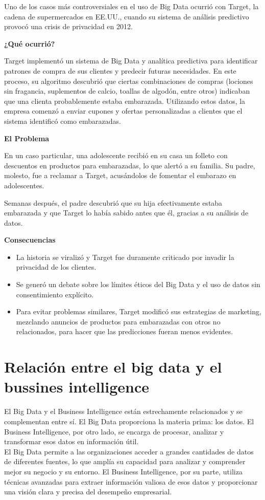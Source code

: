 \documentclass[12pt]{article}
\begin{document}
Uno de los casos más controversiales en el uso de Big Data ocurrió con Target, la cadena de supermercados en EE.UU., 
cuando su sistema de análisis predictivo provocó una crisis de privacidad en 2012.

\textbf{¿Qué ocurrió?}

Target implementó un sistema de Big Data y analítica predictiva para identificar patrones de compra de sus clientes y 
predecir futuras necesidades. En este proceso, su algoritmo descubrió que ciertas combinaciones de compras 
(lociones sin fragancia, suplementos de calcio, toallas de algodón, entre otros) indicaban que una clienta probablemente 
estaba embarazada.
Utilizando estos datos, la empresa comenzó a enviar cupones y ofertas personalizadas a clientes que el sistema identificó 
como embarazadas.

\textbf{El Problema}

En un caso particular, una adolescente recibió en su casa un folleto con descuentos en productos para embarazadas, 
lo que alertó a su familia. Su padre, molesto, fue a reclamar a Target, acusándolos de fomentar el embarazo en adolescentes.

Semanas después, el padre descubrió que su hija efectivamente estaba embarazada y que Target lo había sabido antes que él, 
gracias a su análisis de datos.

\textbf{Consecuencias}

\begin{itemize}
    \item La historia se viralizó y Target fue duramente criticado por invadir la privacidad de los clientes.
    \item Se generó un debate sobre los límites éticos del Big Data y el uso de datos sin consentimiento explícito.
    \item Para evitar problemas similares, Target modificó sus estrategias de marketing, mezclando anuncios de productos 
    para embarazadas con otros no relacionados, para hacer que las predicciones fueran menos evidentes.
\end{itemize}

\section{Relación entre el big data y el bussines intelligence}

El Big Data y el Business Intelligence están estrechamente relacionados y se complementan entre sí. 
El Big Data proporciona la materia prima: los datos. El Business Intelligence, por otro lado, se encarga de procesar, 
analizar y transformar esos datos en información útil.
\\
El Big Data permite a las organizaciones acceder a grandes cantidades de datos de diferentes fuentes, 
lo que amplía su capacidad para analizar y comprender mejor su negocio y su entorno. El Business Intelligence, 
por su parte, utiliza técnicas avanzadas para extraer información valiosa de esos datos y proporcionar una visión clara 
y precisa del desempeño empresarial.
\end{document}

